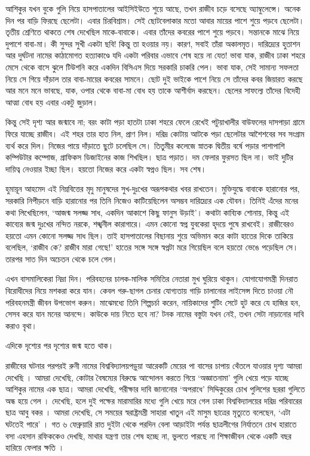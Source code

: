 \documentclass{article}
\begin{document}
আশিকুর যখন বুকে গুলি নিয়ে হাসপাতালের আইসিইউতে শুয়ে আছে, তখন রাজীব চড়ে বসেছে অ্যাম্বুলেন্সে। অনেক দিন পর বাড়ি ফিরছে ছেলেটা। এবার চিরবিশ্রাম। সেই ছোটবেলাকার মতো আবার মায়ের পাশে শুয়ে পড়বে ছেলেটা। তৃতীয় শ্রেণিতে থাকতে শেষ দেখেছিল মাকে-বাবাকে। এবার তাঁদের কবরের পাশে শুয়ে পড়বে। সন্তানকে মাঝে নিয়ে দুপাশে বাবা-মা। কী সুন্দর সুখী একটা ছবি! কিন্তু তা হওয়ার নয়। কারণ, সবাই তাঁরা অকালমৃত। দারিদ্র্যের হুতাশন আর দুর্ঘটনা নামের কাঠামোগত হত্যাকাণ্ডে যদি একটা পরিবার এভাবে শেষ হয়ে না যেত! ভাবা যাক, রাজীব ঢাকা শহরে মেসে থেকে বাসে ঝুলে টিউশনি করে একদিন বিসিএস দিয়ে সরকারি চাকরি পেল। ভাবা যাক, সেই সামান্য সফলতা নিয়ে সে গিয়ে দাঁড়াল তার বাবা-মায়ের কবরের সামনে। ছোট দুই ভাইকে পাশে নিয়ে সে তাঁদের কবর জিয়ারত করছে আর মনে মনে ভাবছে, যাক, ওপার থেকে বাবা-মা বোধ হয় তাকে আশীর্বাদ করছেন। ছেলের সাফল্যে তাঁদের বিদেহী আত্মা বোধ হয় এবার একটু জুড়াল।

কিন্তু সেই দৃশ্য আর জন্মাবে না; বরং কাটা পড়া হাতটা ঢাকা শহরে ফেলে রেখেই পটুয়াখালীর বাউফলের দাসপাড়া গ্রামে ফিরে যাচ্ছে রাজীব। এই শহর তার হাত নিল, প্রাণ নিল। দরিদ্র কোটায় আটকে পড়া ছেলেটার আশৈশবের সব সংগ্রাম ব্যর্থ করে দিল। নিজের পায়ে দাঁড়াতে ছুটে চলেছিল সে। তিতুমীর কলেজে স্নাতক দ্বিতীয় বর্ষে পড়ার পাশাপাশি কম্পিউটার কম্পোজ, গ্রাফিকস ডিজাইনের কাজ শিখছিল। ছাত্র পড়াত। দম ফেলার ফুরসত ছিল না। ভাই দুটির দায়িত্ব নেওয়ার ইচ্ছা ছিল। হয়তো নিজের করে একটা স্বপ্নও ছিল। সব শেষ।

হ‌ুমায়ূন আহমেদ এই নিম্নবিত্তের মৃদু মানুষদের সুখ-দুঃখের অরূপকথার খবর রাখতেন। মুক্তিযুদ্ধে বাবাকে হারানোর পর, সরকারি নিপীড়নে বাড়ি হারানোর পর তিনি নিজেও কাটিয়েছিলেন অসম্ভব দারিদ্র্যের এক যৌবন। তিনিই এঁদের মনের কথা লিখেছিলেন, ‘আজন্ম সলজ্জ সাধ, একদিন আকাশে কিছু ফানুস উড়াই’। কথাটা কাব্যিক শোনায়, কিন্তু এই কাব্যের জন্ম দুঃখের নন্দিত নরকে, শঙ্খনীল কারাগারে। এমন কোনো স্বপ্ন যুবকেরা হৃদয়ে পুষে রাখবেই। রাজীবেরও হয়তো এমন কোনো সলজ্জ সাধ ছিল। তাই হাসপাতালের বিছানায় শুয়ে অভিমান করে কাটা হাতের দিকে তাকিয়ে বলেছিল, ‘রাজীব কে? রাজীব মারা গেছে!’ হাতের সঙ্গে সঙ্গে স্বপ্নটা মরে গিয়েছিল বলে হয়তো ভেঙে পড়েছিল সে। তারপর সাত দিন অচেতন থেকে চলে গেল।

এখন বাসমালিকেরা নিদ্রা দিন। পরিবহনের চালক-মালিক সমিতির নেতারা মুখ ঘুরিয়ে থাকুন। যোগাযোগমন্ত্রী দিনরাত বিরোধীদের নিয়ে মশকরা করে যান। কেবল গরু-ছাগল চেনার যোগ্যতায় গাড়ি চালানোর লাইসেন্স দিতে চাওয়া নৌ পরিবহনমন্ত্রী জীবন উপভোগ করুন। মাঝেমধ্যে তিনি শিল্পচর্চা করেন, নায়িকাদের শুটিং সেটে হুট করে যে হাজির হন, সেসব করে যান মনের আনন্দে। কাউকে দায় নিতে হবে না? টনক নামের বস্তুটা যখন নেই, তখন সেটা নাড়ানোর দাবি করাও বৃথা।

এদিকে দৃশ্যের পর দৃশ্যের জন্ম হতে থাক। 


রাজীবের ঘটনার পরপরই রুনী নামের বিশ্ববিদ্যালয়পড়ুয়া আরেকটি মেয়ের পা বাসের চাপায় থেঁতলে যাওয়ার দৃশ্য আমরা দেখেছি  । আমরা দেখেছি, কোটার বৈষম্যের বিরুদ্ধে আন্দোলন করতে গিয়ে ‘অজ্ঞাতনামা’ গুলি খেয়ে পড়ে যাচ্ছে আশিকুর নামের এক ছাত্র। আমরা দেখেছি, পরীক্ষার দাবি জানানোর ‘অপরাধে’ সিদ্দিকুরের চোখ পুলিশের ছররা গুলিতে অন্ধ হয়ে গেল  । দেখেছি, হলে দুই পক্ষের মারামারির মধ্যে গুলি খেয়ে মরে গেল ঢাকা বিশ্ববিদ্যালয়ের দরিদ্র পরিবারের ছাত্র আবু বকর । আমরা দেখেছি, সে সময়ের স্বরাষ্ট্রমন্ত্রী সাহারা খাতুন এই মাসুম ছাত্রের মৃত্যুতে বলেছেন, ‘এটা ঘটতেই পারে’  । গত ৬ ফেব্রুয়ারি রাত দুইটা থেকে পরদিন বেলা আড়াইটা পর্যন্ত ছাত্রলীগের নির্যাতনে চোখ হারাতে বসা এহসান রফিককেও দেখছি, মাথার যন্ত্রণা তার শেষ হচ্ছে না, ভুলতে পারছে না শিক্ষাজীবন থেকে একটি বছর হারিয়ে ফেলার ক্ষতি  ।
\end{document}
